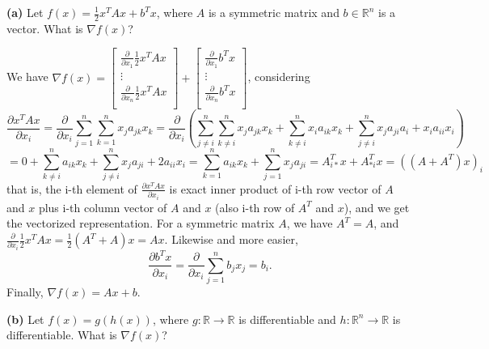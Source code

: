 \documentclass[11pt]{article}
\renewcommand\part[1]{\vspace{.10in}\textbf{(#1)  }}
\begin{document}
\part{a}Let $f(x)=\frac{1}{2}x^TAx + b^Tx$, where $A$ is a symmetric matrix and $b\in \mathbb{R}^n$ is a vector. What is $\nabla f(x)$?

We have $\nabla f(x) = \left[
             \begin{array}{c}
               \frac{\partial}{\partial x_1}\frac{1}{2}x^TAx \\
               \vdots \\
               \frac{\partial}{\partial x_n}\frac{1}{2}x^TAx \\
             \end{array}
           \right] + \left[
             \begin{array}{c}
               \frac{\partial}{\partial x_1}b^Tx \\
               \vdots \\
               \frac{\partial}{\partial x_n}b^Tx \\
             \end{array}
           \right]$, considering $$\frac{\partial x^TAx}{\partial x_i} = \frac{\partial}{\partial x_i}\sum_{j=1}^{n}\sum_{k=1}^{n}x_ja_{jk}x_{k} = \frac{\partial}{\partial x_i}\left(\sum_{j\neq i}^{n}\sum_{k\neq i}^{n}x_ja_{jk}x_{k}+ \sum_{k \neq i}^{n}x_ia_{ik}x_k+\sum_{j \neq i}^{n} x_ja_{ji}a_i+x_ia_{ii}x_i\right) $$
           $$ = 0 + \sum_{k \neq i}^{n}a_{ik}x_k + \sum_{j \neq i}^{n} x_ja_{ji} + 2a_{ii}x_i= \sum_{k = 1}^{n}a_{ik}x_k + \sum_{j=1}^{n} x_ja_{ji} = A_{i*}^Tx+A_{*i}^Tx = \left((A+A^T)x\right)_{i}$$
that is, the i-th element of $\frac{\partial x^TAx}{\partial x_i}$ is exact inner product of i-th row vector of $A$ and $x$ plus i-th column vector of $A$ and $x$ (also i-th row of $A^T$ and $x$), and we get the vectorized representation. For a symmetric matrix $A$, we have $A^T=A$, and $\frac{\partial}{\partial x_i}\frac{1}{2}x^TAx = \frac{1}{2}(A^T+A)x=Ax$. Likewise and more easier,
$$\frac{\partial b^Tx}{\partial x_i} = \frac{\partial}{\partial x_i}\sum_{j=1}^{n}b_jx_j = b_i.$$
Finally, $\nabla f(x) = Ax+b$.

\part{b}Let $f(x)=g(h(x))$, where $g: \mathbb{R} \rightarrow \mathbb{R}$ is differentiable and $h: \mathbb{R}^n \rightarrow \mathbb{R}$ is differentiable. What is $\nabla f(x)$?
\end{document}
